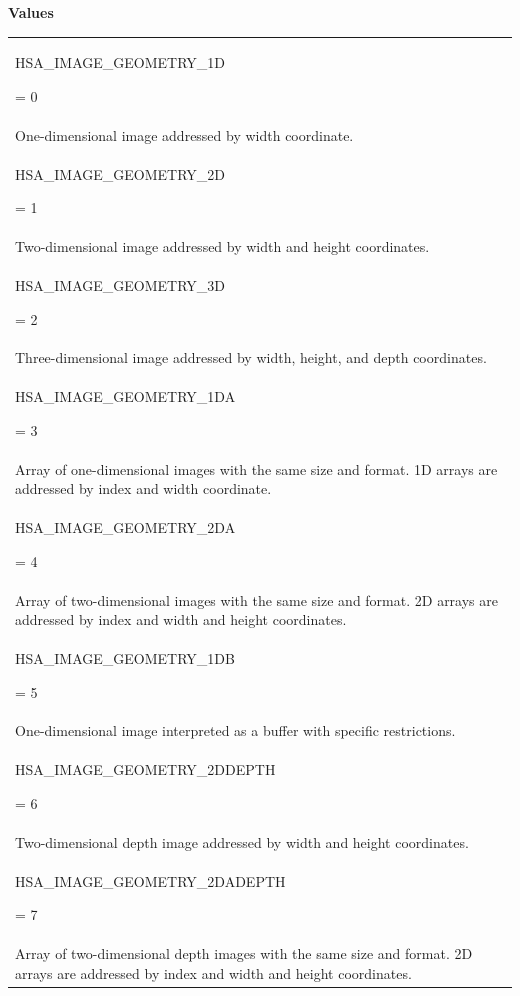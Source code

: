 \documentclass[final]{book}
\newcommand{\reftyp}[1]{#1}
\newcommand{\refenu}[1]{\reftyp{#1}}
\begin{document}
\begin{appendices}
\noindent\textbf{Values}\\[-5mm]
\begin{longtable}{@{\hspace{2em}}p{\linewidth-2em}}
\hspace{-2em}\hypertarget{group--images-1gga31e40ddc0666f01a0821a9bc37ca514ba906f748ddc55778a89e75f04eaa40c03}{\refenu{HSA_IMAGE_GEOMETRY_1D}} = 0\\One-dimensional image addressed by width coordinate.\\[2mm]
\hspace{-2em}\hypertarget{group--images-1gga31e40ddc0666f01a0821a9bc37ca514ba13192d1351526813975249d98a949342}{\refenu{HSA_IMAGE_GEOMETRY_2D}} = 1\\Two-dimensional image addressed by width and height coordinates.\\[2mm]
\hspace{-2em}\hypertarget{group--images-1gga31e40ddc0666f01a0821a9bc37ca514baef64f94a62ec7ec56da35693214ae820}{\refenu{HSA_IMAGE_GEOMETRY_3D}} = 2\\Three-dimensional image addressed by width, height, and depth coordinates.\\[2mm]
\hspace{-2em}\hypertarget{group--images-1gga31e40ddc0666f01a0821a9bc37ca514ba53baffa8c7a3fff2d00054327b6a7530}{\refenu{HSA_IMAGE_GEOMETRY_1DA}} = 3\\Array of one-dimensional images with the same size and format. 1D arrays are addressed by index and width coordinate.\\[2mm]
\hspace{-2em}\hypertarget{group--images-1gga31e40ddc0666f01a0821a9bc37ca514bafdc67eaf97b8a0fdf41746f6f2b53832}{\refenu{HSA_IMAGE_GEOMETRY_2DA}} = 4\\Array of two-dimensional images with the same size and format. 2D arrays are addressed by index and width and height coordinates.\\[2mm]
\hspace{-2em}\hypertarget{group--images-1gga31e40ddc0666f01a0821a9bc37ca514ba1394b52f2f580a22b385a5ea8532e4ba}{\refenu{HSA_IMAGE_GEOMETRY_1DB}} = 5\\One-dimensional image interpreted as a buffer with specific restrictions.\\[2mm]
\hspace{-2em}\hypertarget{group--images-1gga31e40ddc0666f01a0821a9bc37ca514ba753792b8a86b6d375417a6ca16ef5ddb}{\refenu{HSA_IMAGE_GEOMETRY_2DDEPTH}} = 6\\Two-dimensional depth image addressed by width and height coordinates.\\[2mm]
\hspace{-2em}\hypertarget{group--images-1gga31e40ddc0666f01a0821a9bc37ca514ba0d45d37e1d4028dfea2f3b4f879d8d4a}{\refenu{HSA_IMAGE_GEOMETRY_2DADEPTH}} = 7\\Array of two-dimensional depth images with the same size and format. 2D arrays are addressed by index and width and height coordinates.
\end{longtable}


\end{appendices}
\end{document}
